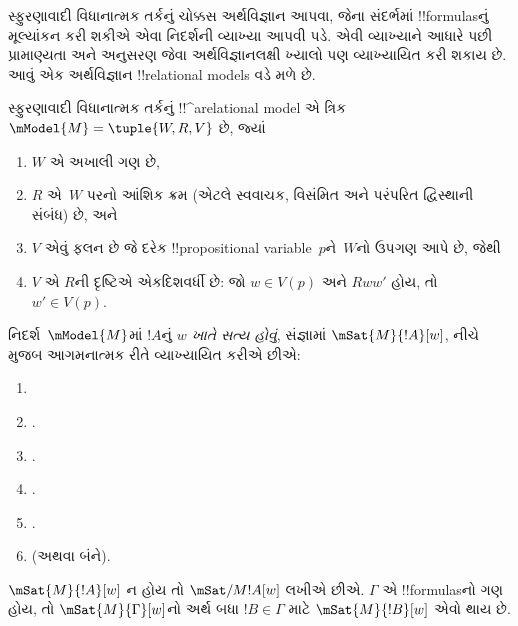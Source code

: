 \documentclass[../../../include/open-logic-section]{subfiles}
\begin{document}


સ્ફુરણાવાદી વિધાનાત્મક તર્કનું ચોક્કસ અર્થવિજ્ઞાન આપવા,
જેના સંદર્ભમાં !!{formula}sનું મૂલ્યાંકન કરી શકીએ એવા
નિદર્શની વ્યાખ્યા આપવી પડે. એવી વ્યાખ્યાને આધારે પછી
પ્રામાણ્યતા અને અનુસરણ જેવા અર્થવિજ્ઞાનલક્ષી ખ્યાલો પણ
વ્યાખ્યાયિત કરી શકાય છે. આવું એક અર્થવિજ્ઞાન
!!{relational model}s વડે મળે છે.

\begin{defn}
  સ્ફુરણાવાદી વિધાનાત્મક તર્કનું !!^a{relational model}
  એ ત્રિક $\mModel{M} = \tuple{W, R, V}$ છે, જ્યાં
  \begin{enumerate}
  \item $W$ એ અખાલી ગણ છે,
  \item $R$ એ~$W$ પરનો આંશિક ક્રમ (એટલે સ્વવાચક, વિસંમિત
    અને પરંપરિત દ્વિસ્થાની સંબંધ) છે, અને
  \item $V$ એવું ફલન છે જે દરેક !!{propositional
    variable}~$p$ને~$W$નો ઉપગણ આપે છે, જેથી
  \item $V$ એ $R$ની દૃષ્ટિએ એકદિશવર્ધી છે: જો $w
    \in V(p)$ અને $Rww'$ હોય, તો $w' \in V(p)$.
  \end{enumerate}
\end{defn}

\begin{defn}
  નિદર્શ~$\mModel{M}$માં $!A$નું \emph{$w$ ખાતે સત્ય
    હોવું}, સંજ્ઞામાં $\mSat{M}{!A}[w]$, નીચે મુજબ
  આગમનાત્મક રીતે વ્યાખ્યાયિત કરીએ છીએ:
  \begin{enumerate}
  \item {}
  \item {}.
  \item {}.
  \item {}.
  \item {}.
  \item {} (અથવા બંને).
  \end{enumerate}
  $\mSat{M}{!A}[w]$ ન હોય તો $\mSat/{M}{!A}[w]$ લખીએ છીએ.
  $\Gamma$ એ !!{formula}sનો ગણ હોય, તો
  $\mSat{M}{\Gamma}[w]$નો અર્થ બધા $!B \in \Gamma$
  માટે $\mSat{M}{!B}[w]$ એવો થાય છે.
\end{defn}
\end{document}
